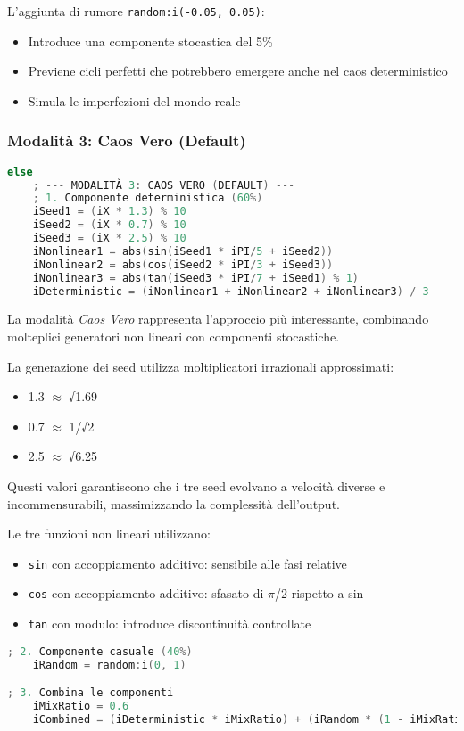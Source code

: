 L'aggiunta di rumore \texttt{random:i({-}0.05, 0.05)}:
\begin{itemize}
 \item Introduce una componente stocastica del 5\%
 \item Previene cicli perfetti che potrebbero emergere anche nel caos deterministico
 \item Simula le imperfezioni del mondo reale
\end{itemize}
\subsubsection{Modalità 3: Caos Vero (Default)}
\begin{lstlisting}[language=C]
else
    ; --- MODALITÀ 3: CAOS VERO (DEFAULT) ---
    ; 1. Componente deterministica (60%)
    iSeed1 = (iX * 1.3) % 10
    iSeed2 = (iX * 0.7) % 10
    iSeed3 = (iX * 2.5) % 10
    iNonlinear1 = abs(sin(iSeed1 * iPI/5 + iSeed2))
    iNonlinear2 = abs(cos(iSeed2 * iPI/3 + iSeed3))
    iNonlinear3 = abs(tan(iSeed3 * iPI/7 + iSeed1) % 1)
    iDeterministic = (iNonlinear1 + iNonlinear2 + iNonlinear3) / 3
\end{lstlisting}

La modalità \textit{Caos Vero} rappresenta l'approccio più interessante, combinando molteplici generatori non lineari con componenti stocastiche.

La generazione dei seed utilizza moltiplicatori irrazionali approssimati:
\begin{itemize}
 \item 1.3 $\approx$ √1.69 
 \item 0.7 $\approx$ 1/√2
 \item 2.5 $\approx$ √6.25
\end{itemize}

Questi valori garantiscono che i tre seed evolvano a velocità diverse e incommensurabili, massimizzando la complessità dell'output.

Le tre funzioni non lineari utilizzano:
\begin{itemize}
 \item \texttt{sin} con accoppiamento additivo: sensibile alle fasi relative
 \item \texttt{cos} con accoppiamento additivo: sfasato di $\pi$/2 rispetto a sin
 \item \texttt{tan} con modulo: introduce discontinuità controllate
\end{itemize}

\begin{lstlisting}[language=C]
    ; 2. Componente casuale (40%)
    iRandom = random:i(0, 1)

; 3. Combina le componenti
    iMixRatio = 0.6
    iCombined = (iDeterministic * iMixRatio) + (iRandom * (1 - iMixRatio))
\end{lstlisting}

